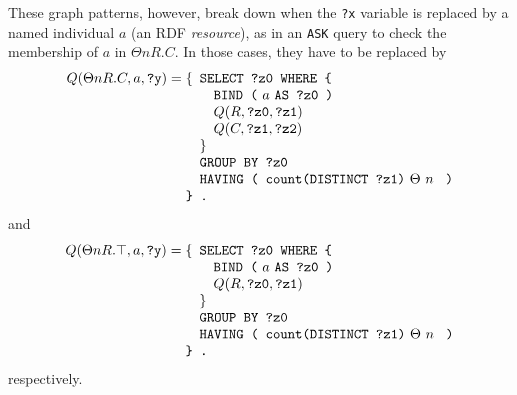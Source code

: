 \documentclass[a4paper]{article}
\newcounter{ex}
\begin{document}
\begin{itemize}
  These graph patterns, however, break down when the \texttt{?x} variable is replaced
  by a named individual $a$ (an RDF \emph{resource}), as in an \texttt{ASK} query
  to check the membership of $a$ in $\Theta nR.C$. In those cases, they have to be
  replaced by
  \begin{equation}
    Q(\Theta nR.C, a, \mbox{\tt ?y}) =
    \begin{minipage}[t]{5in}
      \begin{tabbing}
        \quad\=\quad\=\quad\=\kill
        \{\>\texttt{SELECT ?z0 WHERE \{}\\
        \>\>\texttt{BIND (} $a$ \texttt{AS ?z0 )}\\
        \>\>$Q(R, \mbox{\tt ?z0}, \mbox{\tt ?z1})$\\
        \>\>$Q(C, \mbox{\tt ?z1}, \mbox{\tt ?z2})$\\
        \>\}\\
        \>\texttt{GROUP BY ?z0}\\
        \>\texttt{HAVING ( count(DISTINCT ?z1)} $\Theta$ $n$ \texttt{\ )}\\
        \texttt{\} .}
      \end{tabbing}
    \end{minipage}
  \end{equation}
  and
  \begin{equation}
    Q(\Theta nR.\top, a, \mbox{\tt ?y}) =
    \begin{minipage}[t]{5in}
      \begin{tabbing}
        \quad\=\quad\=\quad\=\kill
        \{\>\texttt{SELECT ?z0 WHERE \{}\\
        \>\>\texttt{BIND (} $a$ \texttt{AS ?z0 )}\\
        \>\>$Q(R, \mbox{\tt ?z0}, \mbox{\tt ?z1})$\\
        \>\}\\
        \>\texttt{GROUP BY ?z0}\\
        \>\texttt{HAVING ( count(DISTINCT ?z1)} $\Theta$ $n$ \texttt{\ )}\\
        \texttt{\} .}
      \end{tabbing}
    \end{minipage}
  \end{equation}
  respectively.


\end{itemize}
\end{document}
